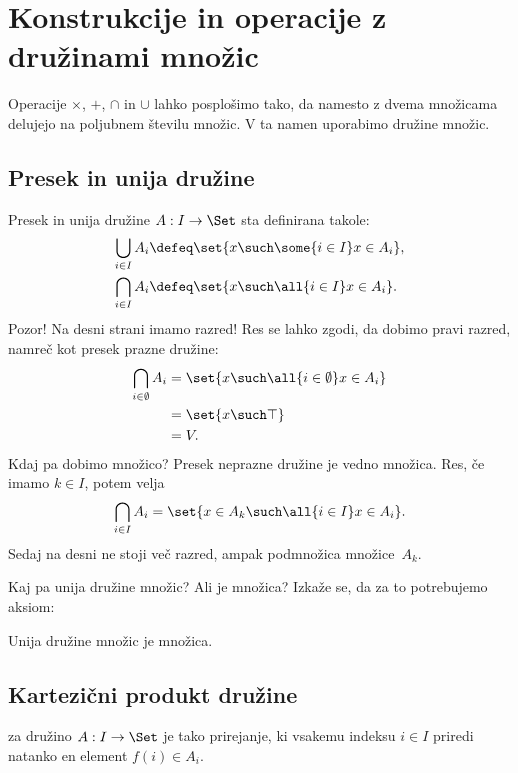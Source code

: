 \section{Konstrukcije in operacije z družinami množic}

Operacije $\times$, $+$, $\cap$ in $\cup$ lahko posplošimo tako, da namesto z dvema
množicama delujejo na poljubnem številu množic. V ta namen uporabimo družine
množic.

\subsection{Presek in unija družine}

Presek in unija družine $A : I \to \Set$ sta definirana takole:
%
\begin{align*}
  \bigcup_{i \in I} A_i &\defeq \set{ x \such \some{i \in I} x \in A_i },
  \\
  \bigcap_{i \in I} A_i &\defeq \set{ x \such \all{ i \in I} x \in A_i }.
\end{align*}
%
Pozor! Na desni strani imamo razred! Res se lahko zgodi, da dobimo pravi razred, namreč
kot presek prazne družine:
%
\begin{align*}
  \bigcap_{i \in \emptyset} A_i
  &= \set{ x \such \all{ i \in \emptyset} x \in A_i } \\
  &= \set { x \such \top } \\
  &= V.
\end{align*}
%
Kdaj pa dobimo množico? Presek neprazne družine je vedno množica. Res, če imamo
$k \in I$, potem velja
%
\begin{equation*}
    \bigcap_{i \in I} A_i = \set{ x \in A_k \such \all{i \in I} x \in A_i}.
\end{equation*}
%
Sedaj na desni ne stoji več razred, ampak podmnožica množice~$A_k$.

Kaj pa unija družine množic? Ali je množica? Izkaže se, da za to potrebujemo aksiom:

\begin{aksiom}
  Unija družine množic je množica.
\end{aksiom}


\subsection{Kartezični produkt družine}

\begin{definicija}
   za družino $A : I \to \Set$ je tako prirejanje, ki vsakemu indeksu $i \in I$ priredi natanko en element $f(i) \in A_i$.
 \end{definicija}

